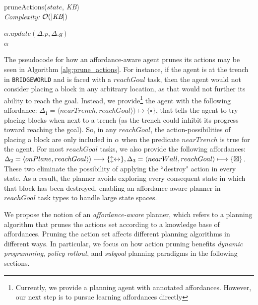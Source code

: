 \documentclass[]{article}
\begin{document}
\begin{algorithm}
  \caption{pruneActions($state$, {\it KB}) \\ {\it Complexity:} $\mathcal{O}(|\text{{\it KB}}|)$}
  \begin{algorithmic}[1]
    \State $\alpha.update(\Delta.p, \Delta.g)$
    \EndIf
    \EndFor \\
    \Return $\alpha$
  \end{algorithmic}
  \label{alg:prune_actions}
\end{algorithm}


The pseudocode for how an affordance-aware agent prunes its actions
may be seen in Algorithm \ref{alg:prune_actions}. For instance, if the
agent is at the trench in \texttt{BRIDGEWORLD} and is faced with a
$reachGoal$ task, then the agent would not consider placing a block in
any arbitrary location, as that would not further its ability to reach
the goal. Instead, we provide\footnote{Currently, we provide a
  planning agent with annotated affordances. However, our next step is
  to pursue learning affordances directly} the agent with the
following affordance: $\Delta_1 = \langle nearTrench, reachGoal
\rangle \rangle \longmapsto \{\square\}$, that tells the agent to try
placing blocks when next to a trench (as the trench could inhibit its
progress toward reaching the goal). So, in any $reachGoal$, the
action-possibilities of placing a block are only included in $\alpha$
when the predicate $nearTrench$ is true for the agent. For most
$reachGoal$ tasks, we also provide the following affordances:
$\Delta_2 = \langle onPlane, reachGoal \rangle \rangle \longmapsto
\{\updownarrow \leftrightarrow\}, \\ \Delta_3 = \langle nearWall,
reachGoal \rangle \longmapsto \{\boxtimes \}$.  These two eliminate
the possibility of applying the ``destroy" action in every state.  As
a result, the planner avoids exploring every consequent state in which
that block has been destroyed, enabling an affordance-aware planner in
$reachGoal$ task types to handle large state spaces.


We propose the notion of an {\it affordance-aware} planner, which
refers to a planning algorithm that prunes the actions set according
to a knowledge base of affordances. Pruning the action set affects
different planning algorithms in different ways. In particular, we
focus on how action pruning benefits {\em dynamic programming}, {\em
  policy rollout}, and {\em subgoal} planning paradigms in the
following sections.
\end{document}
